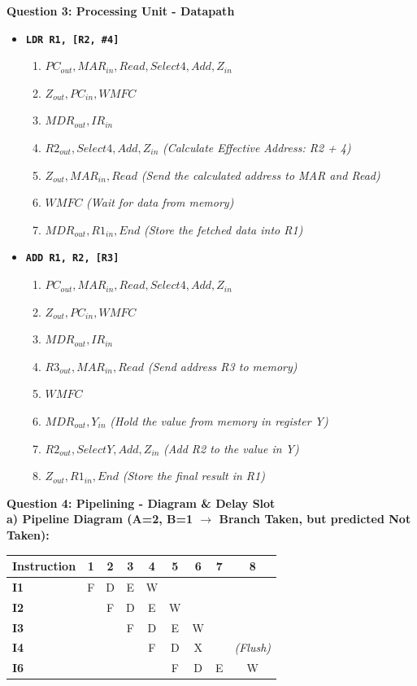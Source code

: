 \documentclass[12pt]{article}
\begin{document}
\textbf{Question 3: Processing Unit - Datapath}
\begin{itemize}
    \item \textbf{\texttt{LDR R1, [R2, \#4]}}
    \begin{enumerate}
        \item $PC_{out}, MAR_{in}, Read, Select4, Add, Z_{in}$
        \item $Z_{out}, PC_{in}, WMFC$
        \item $MDR_{out}, IR_{in}$
        \item $R2_{out}, Select4, Add, Z_{in}$ \textit{(Calculate Effective Address: R2 + 4)}
        \item $Z_{out}, MAR_{in}, Read$ \textit{(Send the calculated address to MAR and Read)}
        \item $WMFC$ \textit{(Wait for data from memory)}
        \item $MDR_{out}, R1_{in}, End$ \textit{(Store the fetched data into R1)}
    \end{enumerate}

    \item \textbf{\texttt{ADD R1, R2, [R3]}}
    \begin{enumerate}
        \item $PC_{out}, MAR_{in}, Read, Select4, Add, Z_{in}$
        \item $Z_{out}, PC_{in}, WMFC$
        \item $MDR_{out}, IR_{in}$
        \item $R3_{out}, MAR_{in}, Read$ \textit{(Send address R3 to memory)}
        \item $WMFC$
        \item $MDR_{out}, Y_{in}$ \textit{(Hold the value from memory in register Y)}
        \item $R2_{out}, SelectY, Add, Z_{in}$ \textit{(Add R2 to the value in Y)}
        \item $Z_{out}, R1_{in}, End$ \textit{(Store the final result in R1)}
    \end{enumerate}
\end{itemize}

\textbf{Question 4: Pipelining - Diagram \& Delay Slot} \\
\textbf{a) Pipeline Diagram (A=2, B=1 $\to$ Branch Taken, but predicted Not Taken):}
\begin{center}
\begin{tabular}{|l|c|c|c|c|c|c|c|c|}
\hline
\textbf{Instruction} & \textbf{1} & \textbf{2} & \textbf{3} & \textbf{4} & \textbf{5} & \textbf{6} & \textbf{7} & \textbf{8} \\
\hline
\textbf{I1} & F & D & E & W & & & & \\
\textbf{I2} & & F & D & E & W & & & \\
\textbf{I3} & & & F & D & E & W & & \\
\textbf{I4} & & & & F & D & X & & \textit{(Flush)} \\
\textbf{I6} & & & & & F & D & E & W \\
\hline
\end{tabular}
\end{center}
\end{document}

